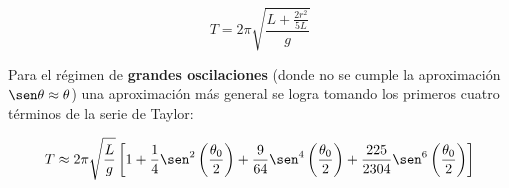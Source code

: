 \begin{equation}
    T = 2\pi \sqrt{\frac{L + \frac{2r^2}{5L}}{g}}
    \label{eq:periodo-pendulo-angulos-pequennos-corregido}
\end{equation}

Para el régimen de \textbf{grandes oscilaciones} (donde no se cumple la aproximación $\sen \theta \approx \theta$) una aproximación más general se logra tomando los primeros cuatro términos de la serie de Taylor:

\begin{equation}
    T \approx 2\pi \sqrt{\frac{L}{g}} \left[ 1 + \frac{1}{4} \sen^2 \left( \frac{\theta_0}{2} \right) + \frac{9}{64} \sen^4 \left( \frac{\theta_0}{2} \right) + \frac{225}{2304} \sen^6 \left( \frac{\theta_0}{2} \right) \right]
    \label{eq:periodo_real}
\end{equation}
